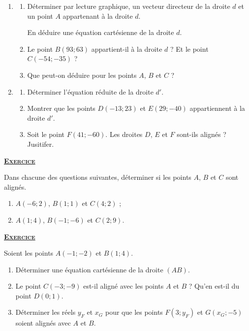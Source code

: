 \documentclass[12pt,a4paper]{article}
\newcounter{nexo}
\newcommand{\exo}{%
\stepcounter{nexo}
{\textbf{\underline{\textsc{Exercice \arabic{nexo}}}}%
\medskip%
}
}
\providecommand{\tightlist}{%
  \setlength{\itemsep}{0pt}\setlength{\parskip}{0pt}}
\begin{document}
\begin{enumerate}
\def\labelenumi{\arabic{enumi}.}
\item
  \begin{enumerate}
  \def\labelenumii{(\alph{enumii})}
  \tightlist
  \item
    Déterminer par lecture graphique, un vecteur directeur de la droite
    \(d\) et un point \(A\) appartenant à la droite \(d\).

    \par

    En déduire une équation cartésienne de la droite \(d\).
  \item
    Le point \(B(93;63)\) appartient-il à la droite \(d\) ? Et le point
    \(C(-54;-35)\) ?
  \item
    Que peut-on déduire pour les points \(A\), \(B\) et \(C\) ?
  \end{enumerate}
\item
  \begin{enumerate}
  \def\labelenumii{(\alph{enumii})}
  \tightlist
  \item
    Déterminer l'équation réduite de la droite \(d'\).
  \item
    Montrer que les points \(D(-13;23)\) et \(E(29;-40)\) appartiennent
    à la droite \(d'\).
  \item
    Soit le point \(F(41;-60)\). Les droites \(D\), \(E\) et \(F\)
    sont-ils alignés ? Jusitifer.
  \end{enumerate}
\end{enumerate}

\medskip

\exo

Dans chacune des questions suivantes, déterminer si les points \(A\),
\(B\) et \(C\) sont alignés.

\begin{enumerate}
\def\labelenumi{\alph{enumi}.}
\tightlist
\item
  \(A(-6;2)\), \(B(1;1)\) et \(C(4;2)\) ;
\item
  \(A(1;4)\), \(B(-1;-6)\) et \(C(2;9)\).
\end{enumerate}

\medskip

\exo

Soient les points \(A(-1;-2)\) et \(B(1;4)\).

\begin{enumerate}
\def\labelenumi{\arabic{enumi}.}
\tightlist
\item
  Déterminer une équation cartésienne de la droite \((AB)\).
\item
  Le point \(C(-3;-9)\) est-il aligné avec les points \(A\) et \(B\) ?
  Qu'en est-il du point \(D(0;1)\).
\item
  Déterminer les réels \(y_F\) et \(x_G\) pour que les points
  \(F(3;y_F)\) et \(G(x_G;-5)\) soient alignés avec \(A\) et \(B\).
\end{enumerate}
\end{document}
